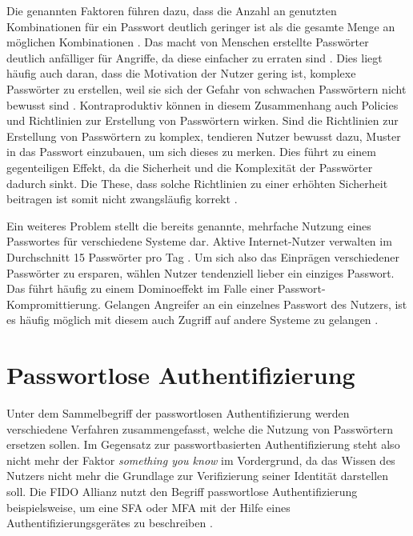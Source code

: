 Die genannten Faktoren führen dazu, dass die Anzahl an genutzten Kombinationen für ein Passwort deutlich geringer ist als die gesamte Menge an möglichen Kombinationen \cite{boonkrong2012security}. Das macht von Menschen erstellte Passwörter deutlich anfälliger für Angriffe, da diese einfacher zu erraten sind \cite{chanda2016password}. Dies liegt häufig auch daran, dass die Motivation der Nutzer gering ist, komplexe Passwörter zu erstellen, weil sie sich der Gefahr von schwachen Passwörtern nicht bewusst sind \cite{yildirim2019encouraging}. Kontraproduktiv können in diesem Zusammenhang auch Policies und Richtlinien zur Erstellung von Passwörtern \cite{yildirim2019encouraging} wirken. Sind die Richtlinien zur Erstellung von Passwörtern zu komplex, tendieren Nutzer bewusst dazu, Muster in das Passwort einzubauen, um sich dieses zu merken. Dies führt zu einem gegenteiligen Effekt, da die Sicherheit und die Komplexität der Passwörter dadurch sinkt. Die These, dass solche Richtlinien zu einer erhöhten Sicherheit beitragen ist somit nicht zwangsläufig korrekt \cite{yildirim2019encouraging} \cite{morii2017research}.

Ein weiteres Problem stellt die bereits genannte, mehrfache Nutzung eines Passwortes für verschiedene Systeme dar. 
Aktive Internet-Nutzer verwalten im Durchschnitt 15 Passwörter pro Tag \cite{ives2004domino}. 
Um sich also das Einprägen verschiedener Passwörter zu ersparen, wählen Nutzer tendenziell lieber ein einziges Passwort. Das führt häufig zu einem Dominoeffekt im Falle einer Passwort-Kompromittierung. 
Gelangen Angreifer an ein einzelnes Passwort des Nutzers, ist es häufig möglich mit diesem auch Zugriff auf andere Systeme zu gelangen \cite{ives2004domino} \cite{morii2017research}. 


\section{Passwortlose Authentifizierung} \label{alts}

Unter dem Sammelbegriff der passwortlosen Authentifizierung werden verschiedene Verfahren zusammengefasst, welche die Nutzung von Passwörtern ersetzen sollen. Im Gegensatz zur passwortbasierten Authentifizierung steht also nicht mehr der Faktor \textit{something you know} im Vordergrund, da das Wissen des Nutzers nicht mehr die Grundlage zur Verifizierung seiner Identität darstellen soll. Die \ac{FIDO} Allianz nutzt den Begriff passwortlose Authentifizierung beispielsweise, um eine \ac{SFA} oder \ac{MFA} mit der Hilfe eines Authentifizierungsgerätes zu beschreiben \cite{farke2020you}. 

